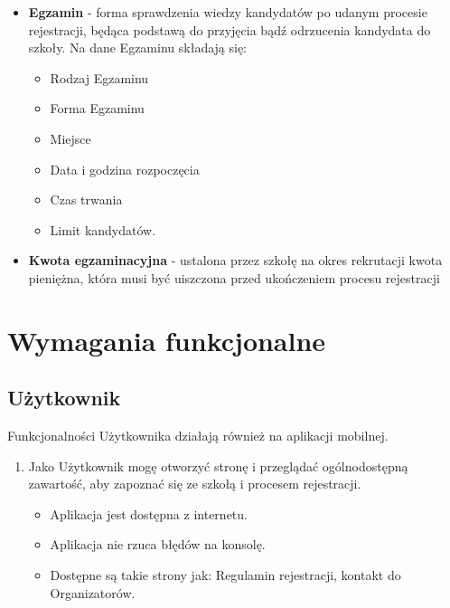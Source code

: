 \documentclass{article}
\begin{document}
\begin{itemize}
	\item \textbf{Egzamin} - forma sprawdzenia wiedzy kandydatów po udanym procesie rejestracji, będąca podstawą do przyjęcia bądź odrzucenia kandydata do szkoły. Na dane Egzaminu składają się:
	\begin{itemize}
	    \item Rodzaj Egzaminu
	    \item Forma Egzaminu
	    \item Miejsce
	    \item Data i godzina rozpoczęcia
	    \item Czas trwania
	    \item Limit kandydatów.
	\end{itemize}
	\item \textbf{Kwota egzaminacyjna} - ustalona przez szkołę na okres rekrutacji kwota pieniężna, która musi być uiszczona przed ukończeniem procesu rejestracji
\end{itemize}

\section{Wymagania funkcjonalne}

\subsection{Użytkownik}
Funkcjonalności Użytkownika działają również na aplikacji mobilnej.
\begin{enumerate}
  \item Jako Użytkownik mogę otworzyć stronę i przeglądać ogólnodostępną zawartość, aby zapoznać się ze szkołą i procesem rejestracji.   
      \begin{itemize}
         \item Aplikacja jest dostępna z internetu.
         \item Aplikacja nie rzuca błędów na konsolę.
         \item Dostępne są takie strony jak: Regulamin rejestracji, kontakt do Organizatorów.
       \end{itemize}
\end{enumerate}
\end{document}
